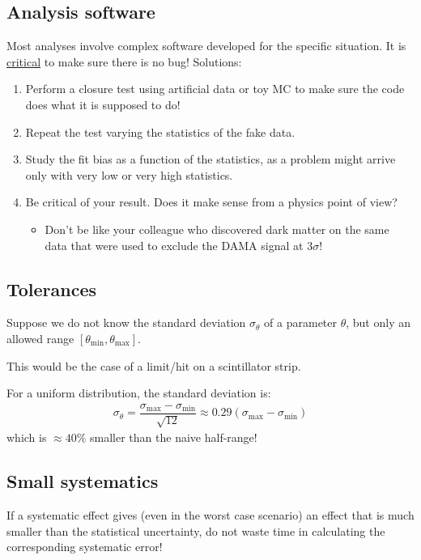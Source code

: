 \subsection{Analysis software}
Most analyses involve complex software developed for the specific situation. It is \underline{critical} to make sure there is no bug!
Solutions:
\begin{enumerate}
  \item Perform a closure test using artificial data or toy MC to make sure the code does what it is supposed to do!
  \item Repeat the test varying the statistics of the fake data. 
  \item Study the fit bias as a function of the statistics, as a problem might arrive only with very low or very high statistics. 
  \item Be critical of your result. Does it make sense from a physics point of view?
    \begin{itemize}[$\to$]
      \item Don't be like your colleague who discovered dark matter on the same data that were used to exclude the DAMA signal at $3\sigma$! 
    \end{itemize}
\end{enumerate}

\subsection{Tolerances}
Suppose we do not know the standard deviation $\sigma_\theta$ of a parameter $\theta$, but only an allowed range $[\theta_{\min}, \theta_{\max}]$. 

This would be the case of a limit/hit  on a scintillator strip. 

For a uniform distribution, the standard deviation is:
\begin{align}
  \sigma_\theta = \dfrac{\sigma_{\max} - \sigma_{\min}}{\sqrt{12}} \approx 0.29 (\sigma_{\max} - \sigma_{\min})
\end{align}
which is $\approx 40 \%$ smaller than the naive half-range!

\subsection{Small systematics}
If a systematic effect gives (even in the worst case scenario) an effect that is much smaller than the statistical uncertainty, do not waste time in calculating the corresponding systematic error!

